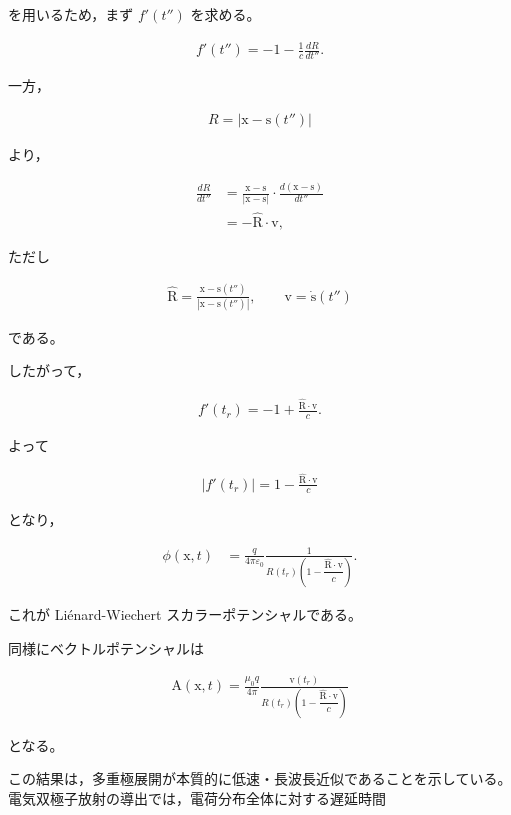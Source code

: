 \documentclass[platex,dvipdfmx,a4paper]{jsarticle}
\newcommand{\vect}[1]{\boldsymbol{\mathrm{#1}}}
\begin{document}
を用いるため，まず $f'(t'')$ を求める。

\begin{align*}
f'(t'')
=
-1-\frac{1}{c}\frac{dR}{dt''}.
\end{align*}

一方，

\begin{align*}
R
=
|\vect{x}-\vect{s}(t'')|
\end{align*}

より，

\begin{align*}
\frac{dR}{dt''}
&=
\frac{\vect{x}-\vect{s}}
{|\vect{x}-\vect{s}|}
\cdot
\frac{d(\vect{x}-\vect{s})}{dt''} \\
&=
-\hat{\vect{R}}\cdot \vect{v},
\end{align*}

ただし

\begin{align*}
\hat{\vect{R}}
=
\frac{\vect{x}-\vect{s}(t'')}
     {|\vect{x}-\vect{s}(t'')|}
,\qquad
\vect{v}
=
\dot{\vect{s}}(t'')
\end{align*}

である。

したがって，

\begin{align*}
f'(t_r)
=
-1+\frac{\hat{\vect{R}}\cdot\vect{v}}{c}.
\end{align*}

よって

\begin{align*}
|f'(t_r)|
=
1-\frac{\hat{\vect{R}}\cdot\vect{v}}{c}
\end{align*}

となり，

\begin{align*}
\phi(\vect{x},t)
&=
\frac{q}{4\pi\varepsilon_0}
\frac{1}
{R(t_r)\left(
1-\dfrac{\hat{\vect{R}}\cdot\vect{v}}{c}
\right)}.
\end{align*}

これが Liénard-Wiechert スカラーポテンシャルである。

同様にベクトルポテンシャルは

\begin{align*}
\vect{A}(\vect{x},t)
=
\frac{\mu_0 q}{4\pi}
\frac{\vect{v}(t_r)}
{R(t_r)\left(
1-\dfrac{\hat{\vect{R}}\cdot\vect{v}}{c}
\right)}
\end{align*}

となる。

この結果は，多重極展開が本質的に低速・長波長近似であることを示している。電気双極子放射の導出では，電荷分布全体に対する遅延時間
\end{document}
